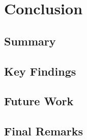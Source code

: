 \chapter{Conclusion}

\section{Summary}

\lipsum

\section{Key Findings}

\lipsum

\section{Future Work}

\lipsum

\section{Final Remarks}

\lipsum